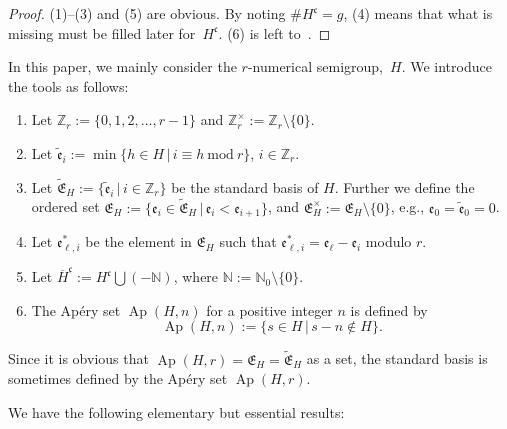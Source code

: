 \documentclass[10pt,a4paper]{amsart}
\def\ZZ{{\mathbb Z}}
\def\NN{{\mathbb N}}
\def\fE{{\mathfrak E}}
\def\fc{{\mathfrak c}}
\def\fe{{\mathfrak e}}
\def\tfE{{\widetilde{\mathfrak E}}}
\def\tfe{{\widetilde{\mathfrak e}}}
\def\lH{{\overline H}}
\numberwithin{equation}{section}
\begin{document}
\begin{proof} (1)--(3) and (5) are obvious.
By noting $\# H^\fc =g$, (4) means that what is missing must be filled later for~$H^\fc$. (6) is left to~\cite{ADGS2016}.
\end{proof}

In this paper, we mainly consider the $r$-numerical semigroup,~$H$.
We introduce the tools as follows:

\begin{Definition}\label{2df:NSG1}\quad
\begin{enumerate}\itemsep=0pt

\item
Let $\ZZ_r:= \{ 0, 1, 2, \dots, r-1\}$ and $\ZZ_r^\times := \ZZ_r \setminus\{0\}$.

\item
Let $\tfe_i :=\min\{h \in H \, |\, i \equiv h \ \text{mod}\ r\}$,
$i \in \ZZ_r$.

\item Let $\tfE_H:=\{\tfe_i \, |\, i \in \ZZ_r\}$ be the standard basis of $H$.
Further we define the ordered set $\fE_H:=\{\fe_i \in \tfE_H \, | \, \fe_i < \fe_{i+1}\}$, and $\fE_H^\times := \fE_H\setminus \{0\}$, e.g., $\fe_{0}=\tfe_0=0$.

\item Let $\fe_{\ell,i}^*$ be the element in $\fE_H$ such that $\fe_{\ell,i}^*= \fe_\ell - \fe_i$ modulo $r$.

\item Let $\lH^\fc:= H^\fc \bigcup (-\NN)$, where $\NN:=\NN_0\setminus\{0\}$.

\item The Ap\'ery set $\operatorname{Ap}(H, n)$ for a positive integer $n$ is defined by
\[
\operatorname{Ap}(H,n):=\{s \in H\, |\, s-n\not\in H\}.
\]
\end{enumerate}
\end{Definition}

Since it is obvious that $\operatorname{Ap}(H, r)=\fE_H=\tfE_H$ as a set, the standard basis is sometimes defined by the Ap\'ery set $\operatorname{Ap}(H, r)$.

We have the following elementary but essential results:
\end{document}
